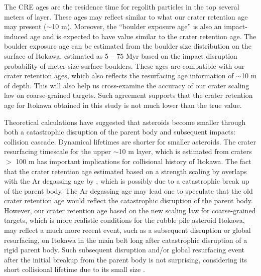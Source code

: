 \documentclass[3p,authoryear]{elsarticle}
\begin{document}
The CRE ages are the residence time for regolith particles in the top several meters of layer. These ages may reflect similar to what our crater retention age may present ($\sim$10 m). Moreover, the ``boulder exposure age'' is also an impact-induced age and is expected to have value similar to the crater retention age. The boulder exposure age can be estimated from the boulder size distribution on the surface of Itokawa. \citet{basilevsky2014} estimated as 5 -- 75 Myr based on the impact disruption probability of meter size surface boulders. These ages are compatible with our crater retention ages, which also reflects the resurfacing age information of $\sim$10 m of depth. This will also help us cross-examine the accuracy of our crater scaling law on coarse-grained targets. Such agreement supports that the crater retention age for Itokawa obtained in this study is not much lower than the true value.

Theoretical calculations have suggested that asteroids become smaller through both a catastrophic disruption of the parent body and subsequent impacts: collision cascade. Dynamical lifetimes are shorter for smaller asteroids. The crater resurfacing timescale for the upper $\sim$10 m layer, which is estimated from craters $>$ 100 m has important implications for collisional history of Itokawa. The fact that the crater retention age estimated based on a strength scaling by \citet{michel2009} overlaps with the Ar degassing age by \citet{park2015}, which is possibly due to a catastrophic break up of the parent body. The Ar degassing age may lead one to speculate that the old crater retention age would reflect the catastrophic disruption of the parent body. However, our crater retention age based on the new scaling law for coarse-grained targets, which is more realistic conditions for the rubble pile asteroid Itokawa, may reflect a much more recent event, such as a subsequent disruption or global resurfacing, on Itokawa in the main belt long after catastrophic disruption of a rigid parent body. Such subsequent disruption and/or global resurfacing event after the initial breakup from the parent body is not surprising, considering its short collisional lifetime due to its small size \citep[e.g.,][]{obrien2005}.
\end{document}
